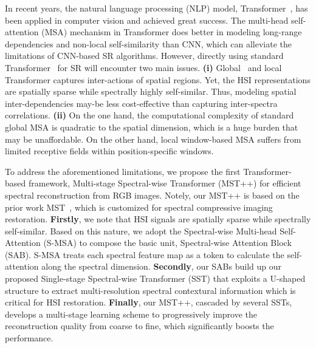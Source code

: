 \documentclass[10pt,twocolumn,letterpaper]{article}
\begin{document}
In recent years, the natural language processing (NLP) model, Transformer~\cite{vaswani2017attention}, has been applied in computer vision and achieved great success. The multi-head self-attention (MSA) mechanism in Transformer does better in modeling long-range dependencies and non-local self-similarity than CNN, which can alleviate the limitations of CNN-based SR algorithms. However, directly using standard Transformer~\cite{global_msa,liu2021swin} for SR will encounter two main issues. \textbf{(i)} Global~\cite{global_msa} and local~\cite{liu2021swin} Transformer captures inter-actions of spatial regions. Yet, the HSI representations are spatially sparse while spectrally highly self-similar. Thus,  modeling spatial inter-dependencies may-be less cost-effective than capturing inter-spectra correlations. \textbf{(ii)} On the one hand, the computational complexity of standard global MSA is quadratic to the spatial dimension, which is a huge burden that may be unaffordable. On the other hand, local window-based MSA suffers from limited receptive fields within position-specific windows. 

To address the aforementioned limitations, we propose the first Transformer-based framework, Multi-stage Spectral-wise Transformer (MST++) for efficient spectral reconstruction from RGB images. Notely, our MST++ is based on the prior work MST~\cite{mst}, which is customized for spectral compressive imaging restoration. \textbf{Firstly}, we note that HSI signals are spatially sparse while spectrally self-similar. Based on this nature, we adopt the Spectral-wise Multi-head Self-Attention (S-MSA) to compose the basic unit, Spectral-wise Attention Block (SAB). S-MSA  treats each spectral feature map as a token to calculate the self-attention along the spectral dimension. \textbf{Secondly}, our SABs build up our proposed Single-stage Spectral-wise Transformer (SST) that exploits a U-shaped structure to extract multi-resolution spectral contextural  information which is critical for HSI restoration. \textbf{Finally}, our MST++, cascaded by several SSTs, develops a multi-stage learning scheme to progressively improve the reconstruction quality from coarse to fine, which significantly boosts the performance.
\end{document}
